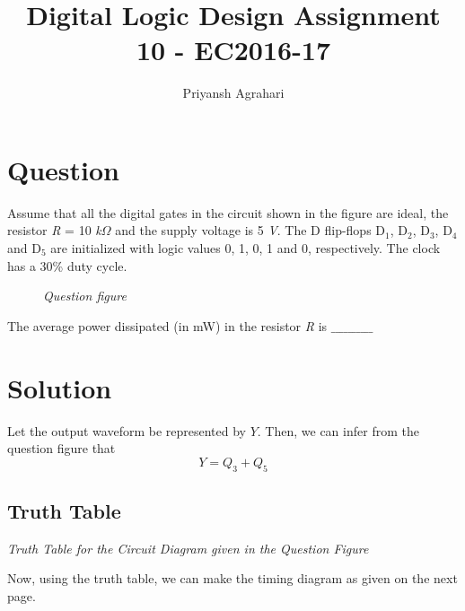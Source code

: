 \documentclass[table,xcdraw]{article}
\title{Digital Logic Design Assignment 10 - EC2016-17}
\author{Priyansh Agrahari}
\begin{document}
\maketitle

\section{Question}
Assume that all the digital gates in the circuit shown in the figure are ideal, the resistor \textit{R} = 10 \textit{k}$\Omega$ and the supply voltage is 5 \textit{V}. The D flip-flops D$_1$, D$_2$, D$_3$, D$_4$ and D$_5$ are initialized with logic values 0, 1, 0, 1 and 0, respectively. The clock has a 30\% duty cycle.

\begin{figure}[h]
    \centering
    \scalebox{0.65}{
     }
    \caption{\textit{Question figure}}
    \label{fig:ques}
\end{figure}

The average power dissipated (in mW) in the resistor \textit{R} is $\_\_\_\_\_\_\_\_\_\_$
\vfill

\section{Solution}
Let the output waveform be represented by $Y$. Then, we can infer from the question figure that
\begin{equation}
    Y=Q_3+Q_5
\end{equation}

\subsection{Truth Table}
\begin{table}[H]
    \centering
    \resizebox{\columnwidth}{!}{
     }
    \caption{\textit{Truth Table for the Circuit Diagram given in the Question Figure}}
    \label{tab:table}
\end{table}
Now, using the truth table, we can make the timing diagram as given on the next page.
\end{document}
